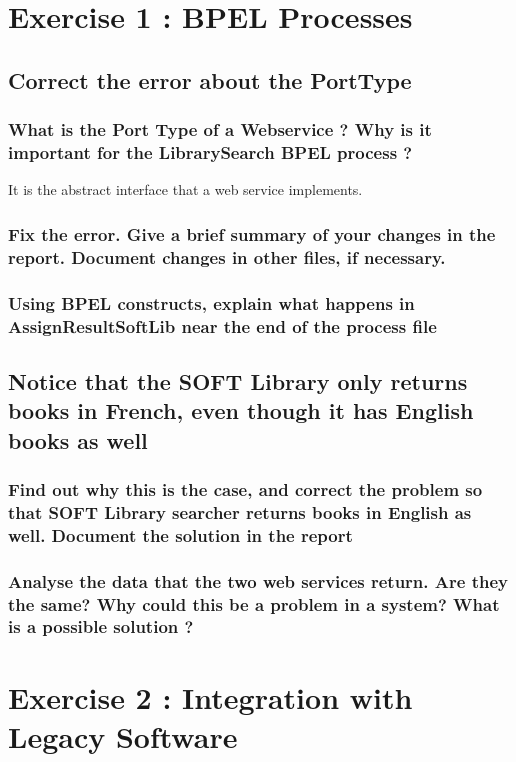 \section{Exercise 1 : BPEL Processes}

\subsection{Correct the error about the PortType}
    \subsubsection{What is the Port Type of a Webservice ? Why is it important for the LibrarySearch BPEL process ?}
    It is the abstract interface that a web service implements. 

    \subsubsection{Fix the error. Give a brief summary of your changes in the report. Document changes in other files, if necessary.}

    \subsubsection{Using BPEL constructs, explain what happens in AssignResultSoftLib near the end of the process file}

\subsection{Notice that the SOFT Library only returns books in French, even though it has English books as well}

    \subsubsection{Find out why this is the case, and correct the problem so that SOFT Library searcher returns books in English as well. Document the solution in the
    report}

    \subsubsection{Analyse the data that the two web services return. Are they the same? Why
    could this be a problem in a system? What is a possible solution ?}

\section{Exercise 2 : Integration with Legacy Software}

